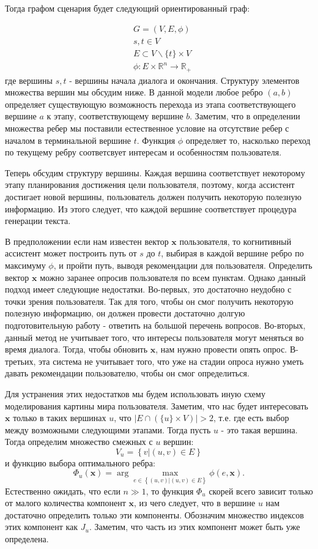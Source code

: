 \documentclass[12pt]{article}
\begin{document}
Тогда графом сценария будет следующий ориентированный граф:

\begin{equation}
\begin{aligned}
&G = (V,E, \phi) \\
&s, t \in V \\
&E \subset V\backslash\{t\}\times V\\
&\phi:E\times \mathbb{R}^n \rightarrow \mathbb{R}_+
\end{aligned}
\end{equation}
где вершины $s,t$ - вершины начала диалога и окончания. Структуру элементов множества вершин мы обсудим ниже. В данной модели любое ребро $(a,b)$ определяет существующую возможность перехода из этапа соответствующего вершине $a$ к этапу, соответствующему вершине $b$. Заметим, что в определении множества ребер мы поставили естественное условие на отсутствие ребер с началом в терминальной вершине $t$. Функция $\phi$ определяет то, насколько переход по текущему ребру соответсвует интересам и особенностям пользователя.

Теперь обсудим структуру вершины. Каждая вершина соответствует некоторому этапу планирования достижения цели пользователя, поэтому, когда ассистент достигает новой вершины, пользователь должен получить некоторую полезную информацию. Из этого следует, что каждой вершине соответствует процедура генерации текста.

В предположении если нам известен вектор $\textbf{x}$ пользователя, то когнитивный ассистент может построить путь от $s$ до $t$, выбирая в каждой вершине ребро по максимуму $\phi$, и пройти путь, выводя рекомендации для пользователя. Определить вектор $\textbf{x}$ можно заранее опросив пользователя по всем пунктам. Однако данный подход имеет следующие недостатки. Во-первых, это достаточно неудобно с точки зрения пользователя. Так для того, чтобы он смог получить некоторую полезную информацию, он должен провести достаточно долгую подготовительную работу - ответить на большой перечень вопросов. Во-вторых, данный метод не учитывает того, что интересы пользователя могут меняться во время диалога. Тогда, чтобы обновить $\textbf{x}$, нам нужно провести опять опрос. В-третьих, эта система не учитывает того, что уже на стадии опроса нужно уметь давать рекомендации пользователю, чтобы он смог определиться.

Для устранения этих недостатков мы будем использовать иную схему моделирования картины мира пользователя. Заметим, что нас будет интересовать $\textbf{x}$ только в таких вершинах $u$, что $|E \cap (\{u\}\times V)|>2$, т.е. где есть выбор между возможными следующими этапами. Тогда пусть  $u$ - это такая вершина. Тогда определим множество смежных с $u$ вершин:
$$V_u = \left\{v|(u,v)\in E\right\}$$
и функцию выбора оптимального ребра:
$$\Phi_u(\textbf{x}) = \arg\max_{e\in\left\{(u,v)|(u,v)\in E\right\}}\phi(e,\textbf{x}).$$
Естественно ожидать, что если $n \gg 1$, то функция $\Phi_u$ скорей всего зависит только от малого количества компонент $\textbf{x}$, из чего следует, что в вершине $u$ нам достаточно определить только эти компоненты. Обозначим множество индексов этих компонент как $J_u$. Заметим, что часть из этих компонент может быть уже определена.
\end{document}
